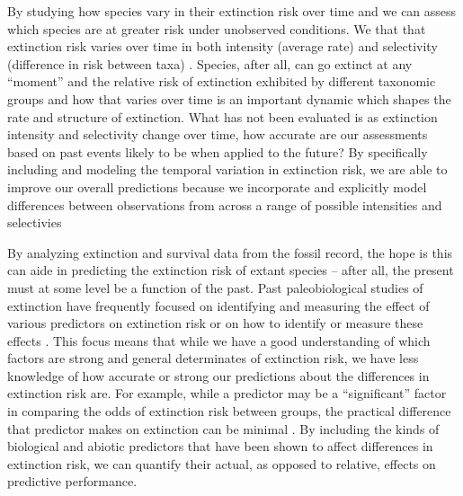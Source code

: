 \documentclass[12pt,letterpaper]{article}
\begin{document}
By studying how species vary in their extinction risk over time and we can assess which species are at greater risk under unobserved conditions. We that that extinction risk varies over time in both intensity (average rate) and selectivity (difference in risk between taxa) \citep{Payne2007,Payne2016,Ezard2011}. Species, after all, can go extinct at any ``moment'' and the relative risk of extinction exhibited by different taxonomic groups and how that varies over time is an important dynamic which shapes the rate and structure of extinction. What has not been evaluated is as extinction intensity and selectivity change over time, how accurate are our assessments based on past events likely to be when applied to the future? By specifically including and modeling the temporal variation in extinction risk, we are able to improve our overall predictions because we incorporate and explicitly model differences between observations from across a range of possible intensities and selectivies

By analyzing extinction and survival data from the fossil record, the hope is this can aide in predicting the extinction risk of extant species -- after all, the present must at some level be a function of the past. Past paleobiological studies of extinction have frequently focused on identifying and measuring the effect of various predictors on extinction risk \citep{Harnik2011,Smits2015,Peters2008,Payne2007,Harnik2012,Ezard2011,Foote2006} or on how to identify or measure these effects \citep{Alroy2010,Alroy2014,Alroy2001,Alroy2000,Alroy2000b,Foote2001}. This focus means that while we have a good understanding of which factors are strong and general determinates of extinction risk, we have less knowledge of how accurate or strong our predictions about the differences in extinction risk are. For example, while a predictor may be a ``significant'' factor in comparing the odds of extinction risk between groups, the practical difference that predictor makes on extinction can be minimal \citep{ARM}. By including the kinds of biological and abiotic predictors that have been shown to affect differences in extinction risk, we can quantify their actual, as opposed to relative, effects on predictive performance.
\end{document}
